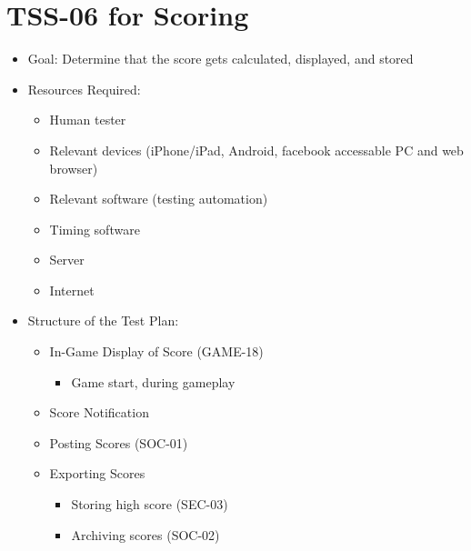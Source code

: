 \section{TSS-06 for Scoring}
\begin{itemize}
\item Goal: Determine that the score gets calculated, displayed, and stored

\item Resources Required:
\begin{itemize}
\item Human tester
\item Relevant devices (iPhone/iPad, Android, facebook accessable PC and web browser)
\item Relevant software (testing automation)
\item Timing software
\item Server
\item Internet
\end{itemize}

\item Structure of the Test Plan:
\begin{itemize}
\item In-Game Display of Score (GAME-18)
\begin{itemize}
\item Game start, during gameplay
\end{itemize}
\item Score Notification
\item Posting Scores (SOC-01)
\item Exporting Scores
\begin{itemize}
\item Storing high score (SEC-03)
\item Archiving scores (SOC-02)
\end{itemize}
\end{itemize}
\end{itemize}

